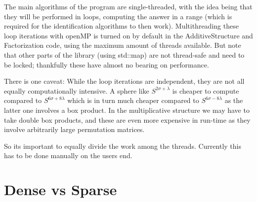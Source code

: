 \begin{DoxyItemize}
\item The main algorithms of the program are single-\/threaded, with the idea being that they will be performed in loops, computing the answer in a range (which is required for the identification algorithms to then work). Multithreading these loop iterations with open\+MP is turned on by default in the {\ttfamily Additive\+Structure} and {\ttfamily Factorization} code, using the maximum amount of threads available. But note that other parts of the library (using {\ttfamily std\+::map}) are not thread-\/safe and need to be locked; thankfully these have almost no bearing on performance.
\item There is one caveat\+: While the loop iterations are independent, they are not all equally computationally intensive. A sphere like $S^{2\sigma+\lambda}$ is cheaper to compute compared to $S^{6\sigma+8\lambda}$ which is in turn much cheaper compared to $S^{6\sigma-8\lambda}$ as the latter one involves a box product. In the multiplicative structure we may have to take double box products, and these are even more expensive in run-\/time as they involve arbitrarily large permutation matrices.
\item So it\textquotesingle{}s important to equally divide the work among the threads. Currently this has to be done manually on the user\textquotesingle{}s end.
\end{DoxyItemize}\hypertarget{perf_densevssparse}{}\section{Dense vs Sparse}\label{perf_densevssparse}

